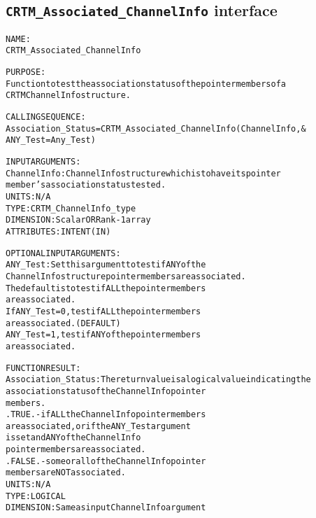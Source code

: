 \subsection{\texttt{CRTM\_Associated\_ChannelInfo} interface}
  \label{sec:CRTM_Associated_ChannelInfo_interface}
  \begin{alltt}
 
  NAME:
        CRTM_Associated_ChannelInfo
 
  PURPOSE:
        Function to test the association status of the pointer members of a
        CRTM ChannelInfo structure.
 
  CALLING SEQUENCE:
        Association_Status = CRTM_Associated_ChannelInfo( ChannelInfo      , &
                                                          ANY_Test=Any_Test  )
 
  INPUT ARGUMENTS:
        ChannelInfo: ChannelInfo structure which is to have its pointer
                     member's association status tested.
                     UNITS:      N/A
                     TYPE:       CRTM_ChannelInfo_type
                     DIMENSION:  Scalar OR Rank-1 array
                     ATTRIBUTES: INTENT(IN)
 
  OPTIONAL INPUT ARGUMENTS:
        ANY_Test:    Set this argument to test if ANY of the
                     ChannelInfo structure pointer members are associated.
                     The default is to test if ALL the pointer members
                     are associated.
                     If ANY_Test = 0, test if ALL the pointer members
                                      are associated.  (DEFAULT)
                        ANY_Test = 1, test if ANY of the pointer members
                                      are associated.
 
  FUNCTION RESULT:
        Association_Status:  The return value is a logical value indicating the
                             association status of the ChannelInfo pointer
                             members.
                             .TRUE.  - if ALL the ChannelInfo pointer members
                                       are associated, or if the ANY_Test argument
                                       is set and ANY of the ChannelInfo
                                       pointer members are associated.
                             .FALSE. - some or all of the ChannelInfo pointer
                                       members are NOT associated.
                             UNITS:      N/A
                             TYPE:       LOGICAL
                             DIMENSION:  Same as input ChannelInfo argument
 
  \end{alltt}
